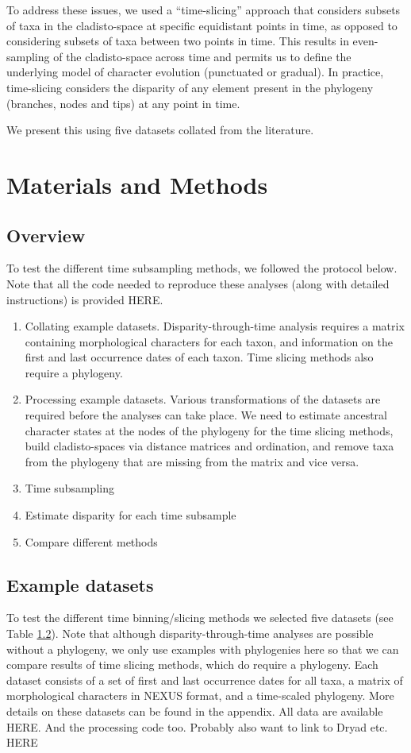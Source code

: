 \documentclass[12pt,a4paper]{article}
\begin{document}
To address these issues, we used a ``time-slicing'' approach that considers subsets of taxa in the cladisto-space at specific equidistant points in time, as opposed to considering subsets of taxa between two points in time.
This results in even-sampling of the cladisto-space across time and permits us to define the underlying model of character evolution (punctuated or gradual).  
In practice, time-slicing considers the disparity of any element present in the phylogeny (branches, nodes and tips) at any point in time.

We present this using five datasets collated from the literature.

\section{Materials and Methods}
\subsection{Overview}
\label{overview-section}
To test the different time subsampling methods, we followed the protocol below. 
Note that all the code needed to reproduce these analyses (along with detailed instructions) is provided HERE.

\begin{enumerate}
  \item Collating example datasets. Disparity-through-time analysis requires a matrix containing morphological characters for each taxon, and information on the first and last occurrence dates of each taxon. Time slicing methods also require a phylogeny.
  \item Processing example datasets. Various transformations of the datasets are required before the analyses can take place. We need to estimate ancestral character states at the nodes of the phylogeny for the time slicing methods, build cladisto-spaces via distance matrices and ordination, and remove taxa from the phylogeny that are missing from the matrix and vice versa.   
  \item Time subsampling
  \item Estimate disparity for each time subsample
  \item Compare different methods
\end{enumerate}


\subsection{Example datasets}
\label{datasets}
To test the different time binning/slicing methods we selected five datasets (see Table \ref{datasets}). 
Note that although disparity-through-time analyses are possible without a phylogeny, we only use examples with phylogenies here so that we can compare results of time slicing methods, which do require a phylogeny. 
Each dataset consists of a set of first and last occurrence dates for all taxa, a matrix of morphological characters in NEXUS format, and a time-scaled phylogeny. 
More details on these datasets can be found in the appendix. All data are available HERE. And the processing code too. Probably also want to link to Dryad etc. HERE
\end{document}
